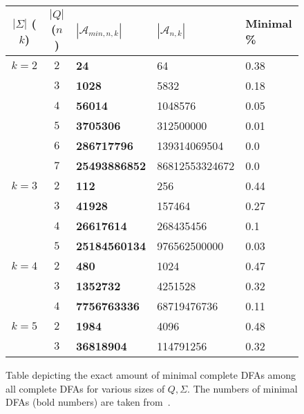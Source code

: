 \begin{figure}[t]
	\centering
	\begin{tabular}{|c|c|l|l|l|}
		\hline
		$|\Sigma|$ ($k$) & $|Q|$ ($n$) & $|\mathcal{A}_{min,n,k}|$ & $|\mathcal{A}_{n,k}|$ & Minimal \% \\\hline
		
		$k = 2$ & $2$ & \textbf{24} & 64 & 0.38 \\
		& $3$ & \textbf{1028} & 5832 & 0.18 \\
		& $4$ & \textbf{56014} & 1048576 & 0.05 \\
		& $5$ & \textbf{3705306} & 312500000 & 0.01 \\
		& $6$ & \textbf{286717796} & 139314069504 & 0.0 \\
		& $7$ & \textbf{25493886852} & 86812553324672 & 0.0 \\\hline
		
		$k = 3$ & $2$ & \textbf{112} & 256 & 0.44 \\
		& $3$ & \textbf{41928} & 157464 & 0.27 \\
		& $4$ & \textbf{26617614} & 268435456 & 0.1 \\
		& $5$ & \textbf{25184560134} & 976562500000 & 0.03 \\\hline
		
		$k = 4$ & $2$ & \textbf{480} & 1024 & 0.47 \\
		& $3$ & \textbf{1352732} & 4251528 & 0.32 \\
		& $4$ & \textbf{7756763336} & 68719476736 & 0.11 \\\hline
		
		$k = 5$ & $2$ & \textbf{1984} & 4096 & 0.48 \\
		& $3$ & \textbf{36818904} & 114791256 & 0.32\\\hline
	\end{tabular}
	\caption{Table depicting the exact amount of minimal complete DFAs among all complete DFAs for various sizes of $Q, \Sigma$. The numbers of minimal DFAs (bold numbers) are taken from~\cite[p. 8]{AMR09}.}
	\label{fig:dfa_minimal_ratios}
\end{figure}
